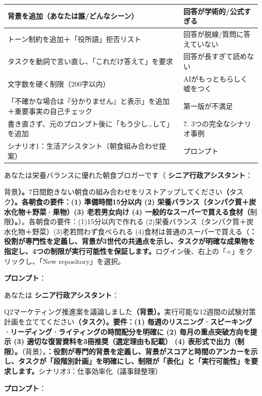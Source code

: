 
\begin{center}
\begin{tabularx}{\linewidth}{|X|X|}
\hline
\textbf{背景を追加（あなたは誰/どんなシーン）} & \textbf{回答が学術的/公式すぎる} \tabularnewline
\hline
トーン制約を追加＋「役所語」拒否リスト & 回答が脱線/質問に答えていない \tabularnewline
タスクを動詞で言い直し、「これだけ答えて」を要求 & 回答が長すぎて読めない \tabularnewline
文字数を硬く制限（200字以内） & AIがもっともらしく嘘をつく \tabularnewline
「不確かな場合は『分かりません』と表示」を追加＋重要事実の自己チェック & 第一版が不満足 \tabularnewline
書き直さず、元のプロンプト後に「もう少し…して」を追加 & 7. 3つの完全なシナリオ事例 \tabularnewline
シナリオ1：生活アシスタント（朝食組み合わせ提案） & プロンプト \tabularnewline
\hline
\end{tabularx}
\end{center}


\begin{tcbinfo}{あなたは栄養バランスに優れた朝食ブロガーです（}
\textbf{シニア行政アシスタント}：

背景\textbf{）。}7日間飽きない朝食の組み合わせをリストアップしてください\textbf{（}タスク\textbf{）。各朝食の要件：(1) 準備時間15分以内 (2) 栄養バランス（タンパク質＋炭水化物＋野菜·果物）(3) 老若男女向け (4) 一般的なスーパーで買える食材（}制限\textbf{）。}）。各朝食の要件：(1)15分以内で作れる (2)栄養バランス（タンパク質＋炭水化物＋野菜）(3)老若問わず食べられる (4)食材は普通のスーパーで買える（\textbf{：役割が専門性を定義し、背景が3世代の共通点を示し、タスクが明確な成果物を指定し、4つの制限が実行可能性を保証します。}ログイン後、右上の「+」をクリックし、「New repository」を選択。

\textbf{プロンプト}：

\end{tcbinfo}

\begin{tcbinfo}{あなたは}
\textbf{シニア行政アシスタント}：

Q2マーケティング推進案を議論しました\textbf{（背景）。}実行可能な12週間の試験対策計画を立ててください\textbf{（タスク）。要件：(1) 毎週のリスニング·スピーキング·リーディング·ライティングの時間配分を明確に (2) 毎月の重点突破方向を提示 (3) 適切な復習資料を3冊推奨（選定理由も記載） (4) 表形式で出力（制限）。}（背景）。\textbf{：役割が専門的背景を定義し、背景がスコアと時間のアンカーを示し、タスクが「段階別計画」を明確にし、制限が「表化」と「実行可能性」を要求します。}シナリオ3：仕事効率化（議事録整理）

\textbf{プロンプト}：

\end{tcbinfo}

